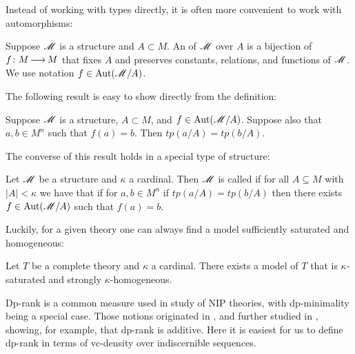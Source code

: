 Instead of working with types directly, it is often more convenient to work with automorphisms:
\begin{Definition}
  Suppose $\mathscr M$ is a structure and $A \subset M$.
  An  of $\mathscr M$ over $A$ is a bijection of $f \colon M \operatorname{\longrightarrow} M$
  that fixes $A$ and preserves constants, relations, and functions of $\mathscr M$.
  We use notation $f \in \operatorname{Aut}(\mathscr M/A)$.
\end{Definition}

The following result is easy to show directly from the definition:
\begin{Lemma}
  Suppose $\mathscr M$ is a structure, $A \subset M$, and $f \in \operatorname{Aut}(\mathscr M/A)$.
  Suppose also that $a,b \in M^n$ such that $f(a) = b$.
  Then $tp(a/A) = tp(b/A)$.
\end{Lemma}

The converse of this result holds in a special type of structure:
\begin{Definition}
  Let $\mathscr M$ be a structure and $\kappa$ a cardinal.
  Then $\mathscr M$ is called  if for all $A \subseteq M$ with $|A| < \kappa$
  we have that if for $a, b \in M^n$ if $tp(a/A) = tp(b/A)$ then
  there exists $f \in \operatorname{Aut}(\mathscr M/A)$ such that $f(a) = b$.
\end{Definition}

Luckily, for a given theory one can always find a model sufficiently saturated and homogeneous:
\begin{Lemma} 
  Let $T$ be a complete theory and $\kappa$ a cardinal.
  There exists a model of $T$ that is $\kappa$-saturated and strongly $\kappa$-homogeneous.
\end{Lemma}




Dp-rank is a common measure used in study of NIP theories, with dp-minimality being a special case.
Those notions originated in \cite{shelah_dp}, and further studied in \cite{dp_add}, showing, for example, that dp-rank is additive.
Here it is easiest for us to define dp-rank in terms of vc-density over indiscernible sequences.

